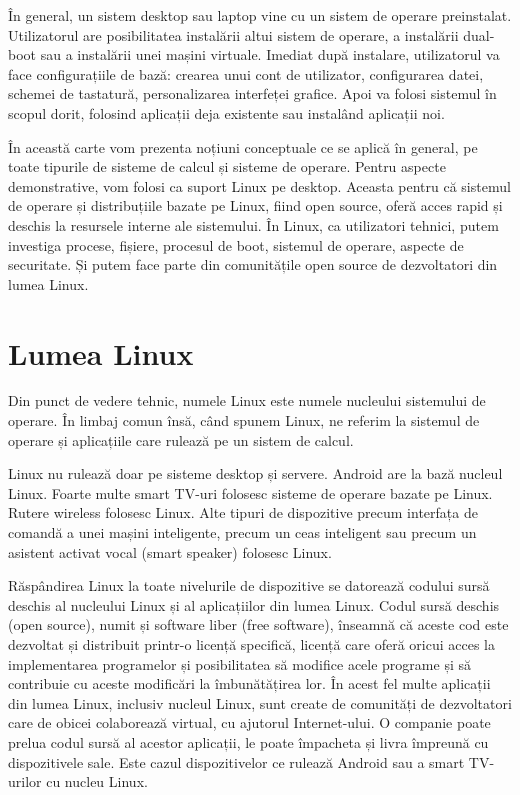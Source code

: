 În general, un sistem desktop sau laptop vine cu un sistem de operare preinstalat. Utilizatorul are posibilitatea instalării altui sistem de operare, a instalării dual-boot sau a instalării unei mașini virtuale. Imediat după instalare, utilizatorul va face configurațiile de bază: crearea unui cont de utilizator, configurarea datei, schemei de tastatură, personalizarea interfeței grafice. Apoi va folosi sistemul în scopul dorit, folosind aplicații deja existente sau instalând aplicații noi.

În această carte vom prezenta noțiuni conceptuale ce se aplică în general, pe toate tipurile de sisteme de calcul și sisteme de operare. Pentru aspecte demonstrative, vom folosi ca suport Linux pe desktop. Aceasta pentru că sistemul de operare și distribuțiile bazate pe Linux, fiind open source, oferă acces rapid și deschis la resursele interne ale sistemului. În Linux, ca utilizatori tehnici, putem investiga procese, fișiere, procesul de boot, sistemul de operare, aspecte de securitate. Și putem face parte din comunitățile open source de dezvoltatori din lumea Linux.

\section{Lumea Linux}
\label{sec:intro:linux}

Din punct de vedere tehnic, numele Linux este numele nucleului sistemului de operare. În limbaj comun însă, când spunem Linux, ne referim la sistemul de operare și aplicațiile care rulează pe un sistem de calcul.

Linux nu rulează doar pe sisteme desktop și servere. Android are la bază nucleul Linux. Foarte multe smart TV-uri folosesc sisteme de operare bazate pe Linux. Rutere wireless folosesc Linux. Alte tipuri de dispozitive precum interfața de comandă a unei mașini inteligente, precum un ceas inteligent sau precum un asistent activat vocal (smart speaker) folosesc Linux.

Răspândirea Linux la toate nivelurile de dispozitive se datorează codului sursă deschis al nucleului Linux și al aplicațiilor din lumea Linux. Codul sursă deschis (open source), numit și software liber (free software), înseamnă că aceste cod este dezvoltat și distribuit printr-o licență specifică, licență care oferă oricui acces la implementarea programelor și posibilitatea să modifice acele programe și să contribuie cu aceste modificări la îmbunătățirea lor. În acest fel multe aplicații din lumea Linux, inclusiv nucleul Linux, sunt create de comunități de dezvoltatori care de obicei colaborează virtual, cu ajutorul Internet-ului. O companie poate prelua codul sursă al acestor aplicații, le poate împacheta și livra împreună cu dispozitivele sale. Este cazul dispozitivelor ce rulează Android sau a smart TV-urilor cu nucleu Linux.

